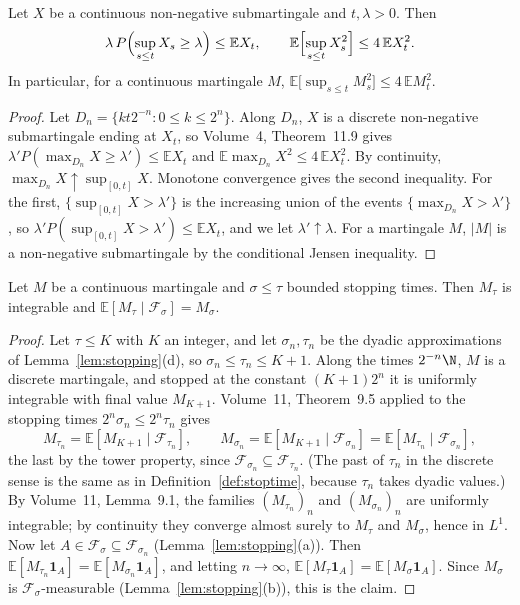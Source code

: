 \begin{theorem}\label{thm:doobcont}
Let $X$ be a continuous non-negative submartingale and $t,\lambda>0$. Then
\[
\lambda\,P\Bigl(\sup_{s\le t}X_s\ge\lambda\Bigr)\le\mathbb EX_t,\qquad\mathbb E\Bigl[\sup_{s\le t}X_s^2\Bigr]\le4\,\mathbb E X_t^2.
\]
In particular, for a continuous martingale $M$, $\mathbb E\bigl[\sup_{s\le t}M_s^2\bigr]\le4\,\mathbb EM_t^2$.
\end{theorem}

\begin{proof}
Let $D_n=\{kt2^{-n}:0\le k\le2^n\}$. Along $D_n$, $X$ is a discrete non-negative submartingale ending at $X_t$, so Volume~4, Theorem~11.9 gives $\lambda'P(\max_{D_n}X\ge\lambda')\le\mathbb EX_t$ and
$\mathbb E\max_{D_n}X^2\le4\,\mathbb EX_t^2$. By continuity, $\max_{D_n}X\uparrow\sup_{[0,t]}X$. Monotone convergence gives the second inequality. For the first, $\{\sup_{[0,t]}X>\lambda'\}$ is the increasing union of
the events $\{\max_{D_n}X>\lambda'\}$, so $\lambda'P(\sup_{[0,t]}X>\lambda')\le\mathbb EX_t$, and we let $\lambda'\uparrow\lambda$. For a martingale $M$, $|M|$ is a non-negative submartingale by the conditional Jensen
inequality.
\end{proof}

\begin{theorem}\label{thm:ostcont}
Let $M$ be a continuous martingale and $\sigma\le\tau$ bounded stopping times. Then $M_\tau$ is integrable and $\mathbb E[M_\tau\mid\mathcal F_\sigma]=M_\sigma$.
\end{theorem}

\begin{proof}
Let $\tau\le K$ with $K$ an integer, and let $\sigma_n,\tau_n$ be the dyadic approximations of Lemma~\ref{lem:stopping}(d), so $\sigma_n\le\tau_n\le K+1$. Along the times $2^{-n}\N$, $M$ is a discrete martingale, and
stopped at the constant $(K+1)2^{n}$ it is uniformly integrable with final value $M_{K+1}$. Volume~11, Theorem~9.5 applied to the stopping times $2^n\sigma_n\le2^n\tau_n$ gives
\[
M_{\tau_n}=\mathbb E[M_{K+1}\mid\mathcal F_{\tau_n}],\qquad M_{\sigma_n}=\mathbb E[M_{K+1}\mid\mathcal F_{\sigma_n}]=\mathbb E[M_{\tau_n}\mid\mathcal F_{\sigma_n}],
\]
the last by the tower property, since $\mathcal F_{\sigma_n}\subseteq\mathcal F_{\tau_n}$. (The past of $\tau_n$ in the discrete sense is the same as in Definition~\ref{def:stoptime}, because $\tau_n$ takes
dyadic values.) By Volume~11, Lemma~9.1, the families $(M_{\tau_n})_n$ and $(M_{\sigma_n})_n$ are uniformly integrable; by continuity they converge almost surely to $M_\tau$ and $M_\sigma$, hence in $L^1$. Now let
$A\in\mathcal F_\sigma\subseteq\mathcal F_{\sigma_n}$ (Lemma~\ref{lem:stopping}(a)). Then $\mathbb E[M_{\tau_n}\mathbf 1_A]=\mathbb E[M_{\sigma_n}\mathbf 1_A]$, and letting $n\to\infty$,
$\mathbb E[M_\tau\mathbf 1_A]=\mathbb E[M_\sigma\mathbf 1_A]$. Since $M_\sigma$ is $\mathcal F_\sigma$-measurable (Lemma~\ref{lem:stopping}(b)), this is the claim.
\end{proof}


